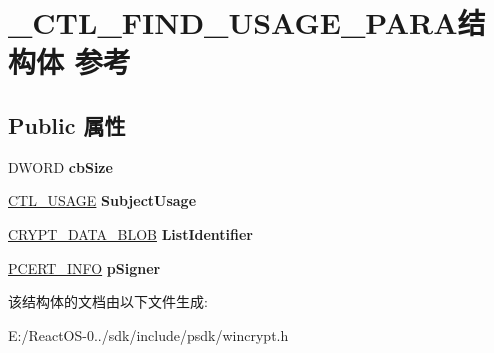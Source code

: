 \hypertarget{struct___c_t_l___f_i_n_d___u_s_a_g_e___p_a_r_a}{}\section{\+\_\+\+C\+T\+L\+\_\+\+F\+I\+N\+D\+\_\+\+U\+S\+A\+G\+E\+\_\+\+P\+A\+R\+A结构体 参考}
\label{struct___c_t_l___f_i_n_d___u_s_a_g_e___p_a_r_a}
\subsection*{Public 属性}
\begin{DoxyCompactItemize}
\item 
\mbox{\label{struct___c_t_l___f_i_n_d___u_s_a_g_e___p_a_r_a_a2bfd1f83f0a83576114897c27f7fb24c}} 
D\+W\+O\+RD {\bfseries cb\+Size}
\item 
\mbox{\label{struct___c_t_l___f_i_n_d___u_s_a_g_e___p_a_r_a_a4986b4084325e7cf2e5a383045585bfb}} 
\hyperlink{struct___c_t_l___u_s_a_g_e}{C\+T\+L\+\_\+\+U\+S\+A\+GE} {\bfseries Subject\+Usage}
\item 
\mbox{\label{struct___c_t_l___f_i_n_d___u_s_a_g_e___p_a_r_a_ac246ec598cb9e51df7559f60490761dd}} 
\hyperlink{struct___c_r_y_p_t_o_a_p_i___b_l_o_b}{C\+R\+Y\+P\+T\+\_\+\+D\+A\+T\+A\+\_\+\+B\+L\+OB} {\bfseries List\+Identifier}
\item 
\mbox{\label{struct___c_t_l___f_i_n_d___u_s_a_g_e___p_a_r_a_ad177d31b3b0c3f75f7961da04d7bd114}} 
\hyperlink{struct___c_e_r_t___i_n_f_o}{P\+C\+E\+R\+T\+\_\+\+I\+N\+FO} {\bfseries p\+Signer}
\end{DoxyCompactItemize}


该结构体的文档由以下文件生成\+:\begin{DoxyCompactItemize}
\item 
E\+:/\+React\+O\+S-\/0../sdk/include/psdk/wincrypt.\+h\end{DoxyCompactItemize}
